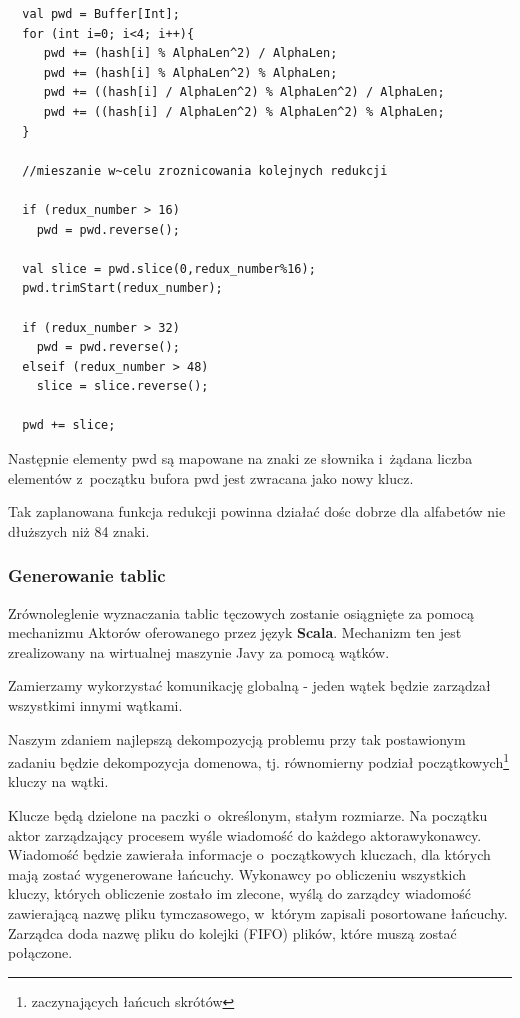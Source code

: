 \documentclass[a4paper]{scrartcl}
\begin{document}
\begin{lstlisting}
  val pwd = Buffer[Int];
  for (int i=0; i<4; i++){
     pwd += (hash[i] % AlphaLen^2) / AlphaLen;
     pwd += (hash[i] % AlphaLen^2) % AlphaLen;
     pwd += ((hash[i] / AlphaLen^2) % AlphaLen^2) / AlphaLen;
     pwd += ((hash[i] / AlphaLen^2) % AlphaLen^2) % AlphaLen;
  }

  //mieszanie w~celu zroznicowania kolejnych redukcji

  if (redux_number > 16)
    pwd = pwd.reverse();
  
  val slice = pwd.slice(0,redux_number%16);
  pwd.trimStart(redux_number);

  if (redux_number > 32)
    pwd = pwd.reverse();
  elseif (redux_number > 48)
    slice = slice.reverse();

  pwd += slice;
\end{lstlisting}

Następnie elementy pwd są mapowane na znaki ze słownika i~żądana liczba elementów z~początku bufora pwd jest zwracana jako nowy klucz.

Tak zaplanowana funkcja redukcji powinna działać dośc dobrze dla alfabetów nie dłuższych niż 84 znaki.

\subsubsection{Generowanie tablic}
Zrównoleglenie wyznaczania tablic tęczowych zostanie osiągnięte za pomocą mechanizmu Aktorów oferowanego przez język \textbf{Scala}.
Mechanizm ten jest zrealizowany na wirtualnej maszynie Javy za pomocą wątków.

Zamierzamy wykorzystać komunikację globalną - jeden wątek będzie zarządzał wszystkimi innymi wątkami.

Naszym zdaniem najlepszą dekompozycją problemu przy tak postawionym zadaniu będzie dekompozycja domenowa, tj. równomierny podział początkowych\footnote{zaczynających łańcuch skrótów} kluczy na wątki.

Klucze będą dzielone na paczki o~określonym, stałym rozmiarze. Na początku aktor zarządzający procesem wyśle wiadomość do każdego aktora\dywiz wykonawcy.
Wiadomość będzie zawierała informacje o~początkowych kluczach, dla których mają zostać wygenerowane łańcuchy.
Wykonawcy po obliczeniu wszystkich kluczy, których obliczenie zostało im zlecone, wyślą do zarządcy wiadomość zawierającą nazwę pliku tymczasowego, w~którym zapisali posortowane łańcuchy.
Zarządca doda nazwę pliku do kolejki (FIFO) plików, które muszą zostać połączone.
\end{document}
